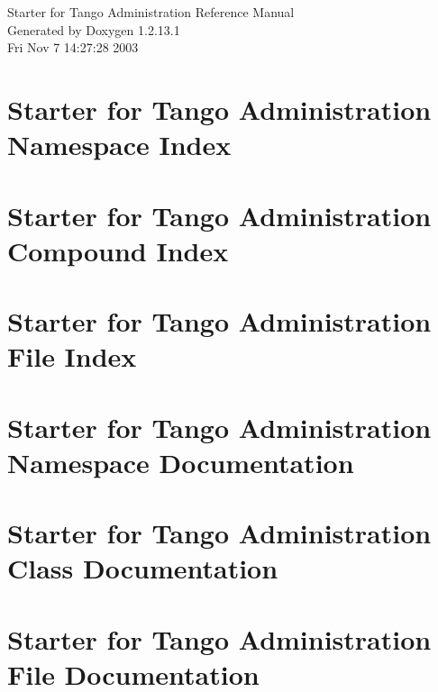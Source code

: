 \documentclass[a4paper]{book}
\begin{document}
\begin{titlepage}
\vspace*{7cm}
\begin{center}
{\Large Starter for Tango Administration Reference Manual}\\
\vspace*{1cm}
{\large Generated by Doxygen 1.2.13.1}\\
\vspace*{0.5cm}
{\small Fri Nov 7 14:27:28 2003}\\
\end{center}
\end{titlepage}
\clearemptydoublepage
{}
\tableofcontents
\clearemptydoublepage
{}
\chapter{Starter for Tango Administration Namespace Index}

\chapter{Starter for Tango Administration Compound Index}

\chapter{Starter for Tango Administration File Index}

\chapter{Starter for Tango Administration Namespace Documentation}


\chapter{Starter for Tango Administration Class Documentation}
















\chapter{Starter for Tango Administration File Documentation}










\printindex
\end{document}
